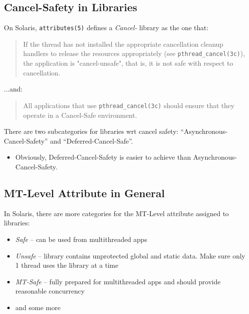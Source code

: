 
\subsection{Cancel-Safety in Libraries}

On Solaris, \texttt{attributes(5)} defines a \emph{Cancel-} library
as the one that:

\begin{quote}
If the thread has not installed the appropriate cancellation cleanup handlers to
release the resources appropriately (see \texttt{pthread\_cancel(3c)}), the
application is "cancel-unsafe", that is, it is not safe with respect to
cancellation.
\end{quote}

...and:

\begin{quote}
All applications that use \texttt{pthread\_cancel(3c)} should ensure that they
operate in a Cancel-Safe environment.
\end{quote}

There are two subcategories for libraries wrt cancel safety:
``Asynchronous-Cancel-Safety'' and ``Deferred-Cancel-Safe''.


\begin{itemize}
\item Obviously, Deferred-Cancel-Safety is easier to achieve than
Asynchronous-Cancel-Safety. 
\end{itemize}


\subsection{MT-Level Attribute in General}

\label{MT_LEVEL}

In Solaris, there are more categories for the MT-Level attribute assigned to
libraries:

\begin{itemize}
\item \emph{Safe} -- can be used from multithreaded apps
\item \emph{Unsafe} -- library contains unprotected global and static data. Make
sure only 1 thread uses the library at a time
\item \emph{MT-Safe} -- fully prepared for multithreaded apps and should provide
reasonable concurrency
\item and some more
\end{itemize}

